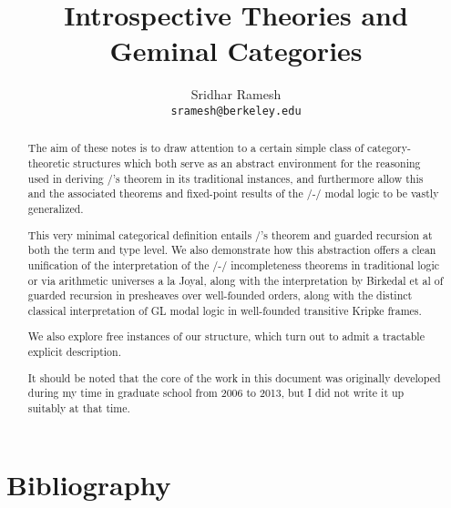 \documentclass[12pt]{article}
\title{Introspective Theories and Geminal Categories}
\author{
  Sridhar Ramesh\\
  \texttt{sramesh@berkeley.edu}
}
\begin{document}
\maketitle

\begin{abstract}

The aim of these notes is to draw attention to a certain simple class of category-theoretic structures which both serve as an abstract environment for the reasoning used in deriving \Loeb/'s theorem in its traditional instances, and furthermore allow this and the associated theorems and fixed-point results of the \Goedel/-\Loeb/ modal logic to be vastly generalized.

This very minimal categorical definition entails \Loeb/'s theorem and guarded recursion at both the term and type level. We also demonstrate how this abstraction offers a clean unification of the interpretation of the \Godel/-\Lob/ incompleteness theorems in traditional logic or via arithmetic universes a la Joyal, along with the interpretation by Birkedal et al of guarded recursion in presheaves over well-founded orders, along with the distinct classical interpretation of GL modal logic in well-founded transitive Kripke frames.

We also explore free instances of our structure, which turn out to admit a tractable explicit description.

It should be noted that the core of the work in this document was originally developed during my time in graduate school from 2006 to 2013, but I did not write it up suitably at that time.
\end{abstract}

\newpage
\tableofcontents

\newpage
\setcounter{section}{-1}
\setcounter{page}{1}








\newpage
\section{Bibliography}
\printbibliography

\printindex



\end{document}
